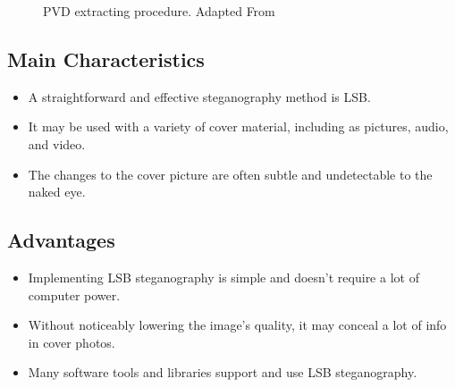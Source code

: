 \begin{figure}[ht!]
\centering
{}
\caption{PVD extracting procedure. Adapted From \cite{pvd}}
\end{figure}

\subsection{Main Characteristics}
\begin{itemize}
\item A straightforward and effective steganography method is LSB.
\item It may be used with a variety of cover material, including as pictures, audio, and video.
\item The changes to the cover picture are often subtle and undetectable to the naked eye.
\end{itemize}

\subsection{Advantages}
\begin{itemize}
\item Implementing LSB steganography is simple and doesn't require a lot of computer power.
\item Without noticeably lowering the image's quality, it may conceal a lot of info in cover photos.
\item Many software tools and libraries support and use LSB steganography.
\end{itemize}


